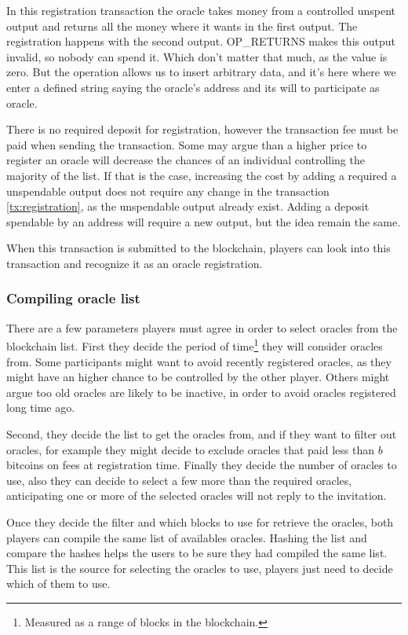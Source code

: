 In this registration transaction the oracle takes money from a controlled
  unspent output and returns all the money where it wants in the first
  output.
The registration happens with the second output. OP\_RETURNS makes this output
  invalid, so nobody can spend it.
Which don't matter that much, as the value is zero. But the operation allows
  us to insert arbitrary data, and it's here where we enter a defined string
  saying the oracle's address and its will to participate as oracle.

There is no required deposit for registration, however the transaction fee must
  be paid when sending the transaction.
Some may argue than a higher price to register an oracle will decrease the
  chances of an individual controlling the majority of the list.
If that is the case, increasing the cost by adding a required a unspendable
output does not require any change in the transaction \ref{tx:registration},
  as the unspendable output already exist.
Adding a deposit spendable by an address will require a new output, but the
  idea remain the same.

When this transaction is submitted to the blockchain, players can look into
  this transaction and recognize it as an oracle registration.

\subsubsection{Compiling oracle list}

There are a few parameters players must agree in order to select oracles from
  the blockchain list.
First they decide the period of time\footnote{Measured as a range of blocks in
  the blockchain.} they will consider oracles from.
Some participants might want to avoid recently registered oracles, as they might
  have an higher chance to be controlled by the other player.
Others might argue too old oracles are likely to be inactive, in order to avoid
  oracles registered long time ago.

Second, they decide the list to get the oracles from, and if they want to filter
  out oracles, for example they might decide to exclude oracles that paid less
  than $b$ bitcoins on fees at registration time.
Finally they decide the number of oracles to use, also they can decide to
  select a few more than the required oracles, anticipating one or more of
  the selected oracles will not reply to the invitation.

Once they decide the filter and which blocks to use for retrieve the oracles,
  both players can compile the same list of availables oracles.
Hashing the list and compare the hashes helps the users to be sure they had
  compiled the same list.
This list is the source for selecting the oracles to use, players just need to
  decide which of them to use.

